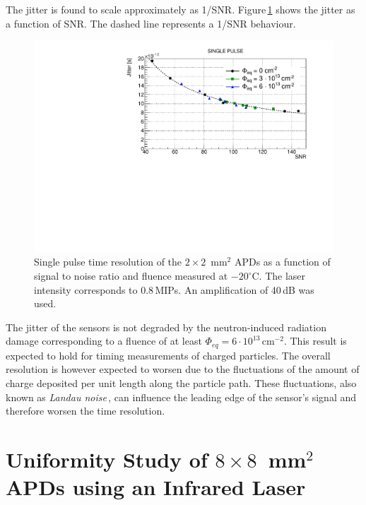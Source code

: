\documentclass{article}
\begin{document}
The jitter is found to scale approximately as 1/SNR.
Figure\,\ref{fig:timeRes2x2_snr} shows the jitter as a function of SNR.
The dashed line represents a 1/SNR behaviour.

\begin{figure}
  \centering
  \includegraphics[width = 0.6 \textwidth]{timeRes2x2APDsNo1e15_SNR}
  \caption{Single pulse time resolution of the $2 \times 2$~mm$^2$ APDs as a function of signal to noise ratio and fluence measured at $-20^\circ$C. The laser intensity corresponds to 0.8\,MIPs. An amplification of 40\,dB was used.}
  \label{fig:timeRes2x2_snr}
\end{figure}

The jitter of the sensors is not degraded by the neutron-induced radiation damage corresponding to a fluence of at least $\Phi_{eq} = 6 \cdot 10^{13}$\,cm$^{-2}$.
This result is expected to hold for timing measurements of charged particles.
The overall resolution is however expected to worsen due to the fluctuations of the amount of charge deposited per unit length along the particle path.
These fluctuations, also known as {\em Landau noise}\,\cite{cartiglia2017}, can influence the leading edge of the sensor's signal and therefore worsen the time resolution.

\section{Uniformity Study of $8 \times 8$~mm$^2$ APDs using an Infrared Laser}
\label{sec:unif8x8laser}
\end{document}
